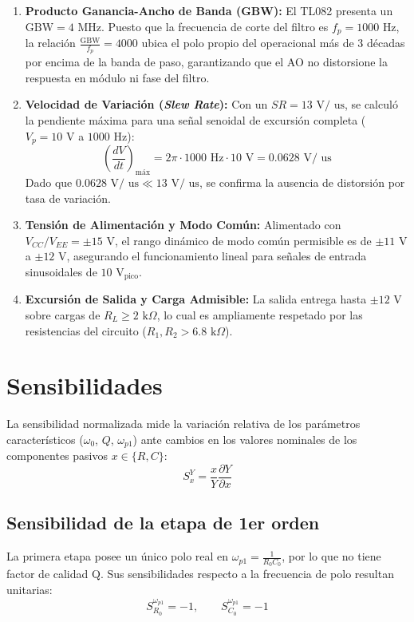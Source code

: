 \documentclass[12pt]{article}
\begin{document}
\begin{enumerate}
    \item \textbf{Producto Ganancia-Ancho de Banda (GBW):} El TL082 presenta un $\text{GBW} = 4\text{ MHz}$. Puesto que la frecuencia de corte del filtro es $f_p = 1000\text{ Hz}$, la relación $\frac{\text{GBW}}{f_p} = 4000$ ubica el polo propio del operacional más de 3 décadas por encima de la banda de paso, garantizando que el AO no distorsione la respuesta en módulo ni fase del filtro.
    
    \item \textbf{Velocidad de Variación (\textit{Slew Rate}):} Con un $SR = 13\text{ V/ us}$, se calculó la pendiente máxima para una señal senoidal de excursión completa ($V_p = 10\text{ V}$ a $1000\text{ Hz}$):
    \begin{equation}
        \left( \frac{dV}{dt} \right)_{\text{máx}} = 2 \pi \cdot 1000\text{ Hz} \cdot 10\text{ V} = 0.0628\text{ V/ us}
    \end{equation}
    Dado que $0.0628\text{ V/ us} \ll 13\text{ V/ us}$, se confirma la ausencia de distorsión por tasa de variación.
    \item \textbf{Tensión de Alimentación y Modo Común:} Alimentado con $V_{CC}/V_{EE} = \pm 15\text{ V}$, el rango dinámico de modo común permisible es de $\pm 11\text{ V}$ a $\pm 12\text{ V}$, asegurando el funcionamiento lineal para señales de entrada sinusoidales de $10\text{ V}_{\text{pico}}$.
    \item \textbf{Excursión de Salida y Carga Admisible:} La salida entrega hasta $\pm 12\text{ V}$ sobre cargas de $R_L \ge 2\text{ k}\Omega$, lo cual es ampliamente respetado por las resistencias del circuito ($R_1, R_2 > 6.8\text{ k}\Omega$).
\end{enumerate}


\section{Sensibilidades} 


 La sensibilidad normalizada mide la variación relativa de los parámetros característicos ($\omega_0$, $Q$, $\omega_{p1}$) ante cambios en los valores nominales de los componentes pasivos $x \in \{R, C\}$:
\begin{equation}
    S_x^Y = \frac{x}{Y} \frac{\partial Y}{\partial x}
\end{equation}

\subsection{Sensibilidad de la etapa de 1er orden}
La primera etapa posee un único polo real en $\omega_{p1} = \frac{1}{R_0 C_0}$, por lo que no tiene factor de calidad Q. Sus sensibilidades respecto a la frecuencia de polo resultan unitarias:
\begin{equation}
    S_{R_0}^{\omega_{p1}} = -1, \qquad S_{C_0}^{\omega_{p1}} = -1
\end{equation}
\end{document}
